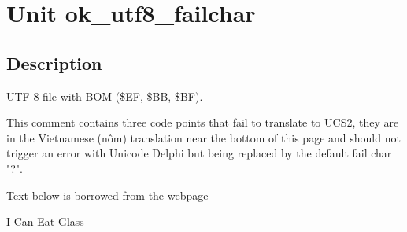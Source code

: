 \documentclass{report}
\begin{document}
\label{toc}\tableofcontents
\newpage
\newlength{\tmplength}
\chapter{Unit ok{\_}utf8{\_}failchar}
\label{ok_utf8_failchar}
\section{Description}
UTF{-}8 file with BOM ({\$}EF, {\$}BB, {\$}BF).

This comment contains three code points that fail to translate to UCS2, they are in the Vietnamese (nôm) translation near the bottom of this page and should not trigger an error with Unicode Delphi but being replaced by the default fail char "?".

Text below is borrowed from the webpage 

I Can Eat Glass\\{}
\end{document}
